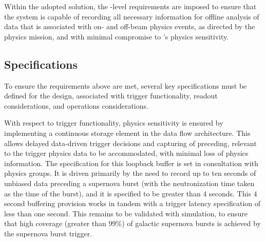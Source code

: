 Within the adopted solution, the -level requirements are
imposed to ensure that the 
system is capable of recording all necessary information for offline 
analysis of data that is associated with on- and off-beam physics events, as directed
by the  physics mission, and with minimal compromise to
's physics sensitivity.


 
\subsection{Specifications}
\label{sec:fd-daq:specifications}

To ensure the requirements above are
met, several key specifications must be defined for the 
design, associated with trigger functionality, readout considerations,
and operations considerations. 

With respect to trigger functionality, physics sensitivity is ensured
by implementing a continuous storage element in the data flow
architecture. This allows delayed data-driven trigger decisions and
capturing of preceding, relevant to the trigger physics data to be
accommodated, with minimal loss of physics information. The
specification for this loopback buffer is set in consultation with
physics groups. It is driven primarily by the need to record up to ten
seconds of unbiased data preceding a supernova burst (with the
neutronization time taken as the time of the burst), and it is
specified to be greater than 4 seconds. This 4 second
buffering provision works in tandem with a trigger latency
specification of less than one second. This remains to be validated
with simulation, to ensure that high coverage (greater than 99\%) of galactic supernova
bursts is achieved by the supernova burst trigger.

